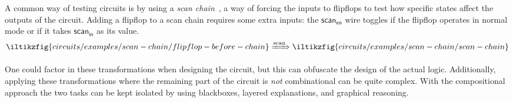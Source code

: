 \begin{example}
    A common way of testing circuits is by using a
    \emph{scan chain}~\cite{mourad2000principles}, a way of forcing the
    inputs to flipflops to test how specific states affect the outputs of the
    circuit.
    Adding a flipflop to a scan chain requires some extra inputs: the
    \(\mathsf{scan}_\mathsf{en}\) wire toggles if the flipflop operates in
    normal mode or if it takes \(\mathsf{scan}_\mathsf{in}\) as its value.
    \[
        \iltikzfig{circuits/examples/scan-chain/flipflop-before-chain}
        \xRightarrow{\text{scan}}
        \iltikzfig{circuits/examples/scan-chain/scan-chain}
    \]
\end{example}

One could factor in these transformations when designing the circuit, but this
can obfuscate the design of the actual logic.
Additionally, applying these transformations where the remaining part of the
circuit is \emph{not} combinational can be quite complex.
With the compositional approach the two tasks can be kept isolated by using
blackboxes, layered explanations, and graphical reasoning.